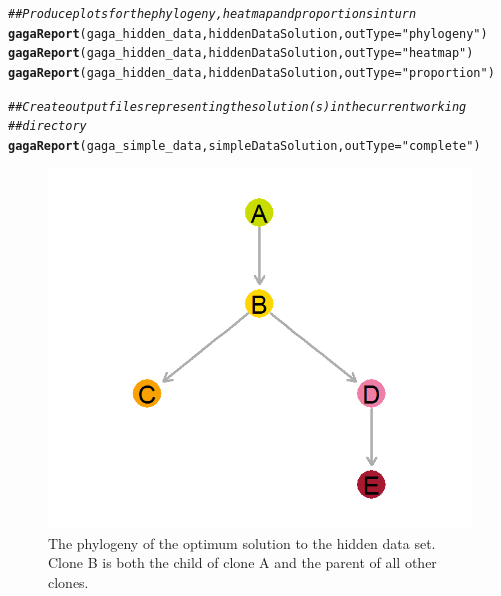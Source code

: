 \documentclass[a4paper]{article}\usepackage[]{graphicx}\usepackage[]{color}
\makeatletter
\newcommand{\hlstr}[1]{\textcolor[rgb]{0.192,0.494,0.8}{#1}}%
\newcommand{\hlcom}[1]{\textcolor[rgb]{0.678,0.584,0.686}{\textit{#1}}}%
\newcommand{\hlstd}[1]{\textcolor[rgb]{0.345,0.345,0.345}{#1}}%
\newcommand{\hlkwc}[1]{\textcolor[rgb]{0.333,0.667,0.333}{#1}}%
\newcommand{\hlkwd}[1]{\textcolor[rgb]{0.737,0.353,0.396}{\textbf{#1}}}%
\newenvironment{kframe}{%
 \def\at@end@of@kframe{}%
 \ifinner\ifhmode%
  \def\at@end@of@kframe{\end{minipage}}%
  \begin{minipage}{\columnwidth}%
 \fi\fi%
 \def\FrameCommand##1{\hskip\@totalleftmargin \hskip-\fboxsep
 \colorbox{shadecolor}{##1}\hskip-\fboxsep
     \hskip-\linewidth \hskip-\@totalleftmargin \hskip\columnwidth}%
 \MakeFramed {\advance\hsize-\width
   \@totalleftmargin\z@ \linewidth\hsize
   \@setminipage}}%
 {\par\unskip\endMakeFramed%
 \at@end@of@kframe}
\newenvironment{knitrout}{}{} %
\makeatother
\begin{document}
\begin{knitrout}
\color{fgcolor}\begin{kframe}
\begin{alltt}
\hlcom{## Produce plots for the phylogeny, heatmap and proportions in turn}
\hlkwd{gagaReport}\hlstd{(gaga_hidden_data, hiddenDataSolution,} \hlkwc{outType} \hlstd{=} \hlstr{"phylogeny"}\hlstd{)}
\hlkwd{gagaReport}\hlstd{(gaga_hidden_data, hiddenDataSolution,} \hlkwc{outType} \hlstd{=} \hlstr{"heatmap"}\hlstd{)}
\hlkwd{gagaReport}\hlstd{(gaga_hidden_data, hiddenDataSolution,} \hlkwc{outType} \hlstd{=} \hlstr{"proportion"}\hlstd{)}

\hlcom{## Create output files representing the solution(s) in the current working}
\hlcom{## directory}
\hlkwd{gagaReport}\hlstd{(gaga_simple_data, simpleDataSolution,} \hlkwc{outType} \hlstd{=} \hlstr{"complete"}\hlstd{)}
\end{alltt}
\end{kframe}
\end{knitrout}


\begin{figure}[H]
    \centering
    \includegraphics[width=\textwidth]{gaga_hidden_data_phylogeny.png}
    \caption{The phylogeny of the optimum solution to the hidden data set.  Clone B is both the child of clone A and the parent of all other clones.}
\end{figure}
\end{document}
